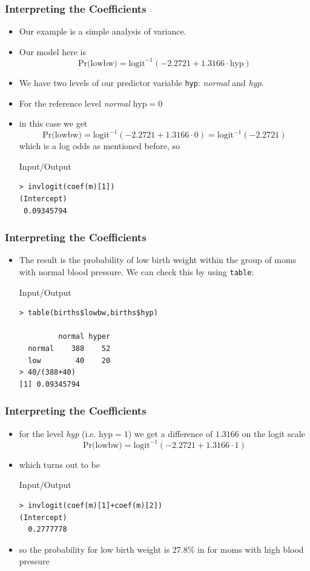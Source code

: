 \begin{frame}[fragile]\frametitle{Interpreting the Coefficients}
\begin{itemize}
\item Our example is a simple analysis of variance. 
\item Our model here is $$\mbox{Pr(lowbw)}=\mbox{logit}^{-1}(-2.2721 + 1.3166 \cdot \mbox{hyp})$$
\item We have two levels of our predictor variable \texttt{hyp}: \emph{normal} and \emph{hyp}. 
\item For the reference level \emph{normal} $\mbox{hyp}=0$ 
\item in this case we get \small $$\mbox{Pr(lowbw)}=\mbox{logit}^{-1}(-2.2721 + 1.3166 \cdot 0) = \mbox{logit}^{-1}(-2.2721)$$ which is a log odds as mentioned before, so 
  \begin{exampleblock}{Input/Output}
\begin{verbatim}
> invlogit(coef(m)[1]) 
(Intercept) 
 0.09345794 
\end{verbatim}
  \end{exampleblock}
\end{itemize}
\end{frame}

\begin{frame}[fragile]\frametitle{Interpreting the Coefficients}
\begin{itemize}
\item The result is the probability of low birth weight within the group of moms with normal blood pressure. We can check this by using \texttt{table}:
  \begin{exampleblock}{Input/Output}
\begin{verbatim}
> table(births$lowbw,births$hyp)
        
         normal hyper
  normal    388    52
  low        40    20
> 40/(388+40)
[1] 0.09345794
\end{verbatim}
  \end{exampleblock}
\end{itemize}
\end{frame}

\begin{frame}[fragile]\frametitle{Interpreting the Coefficients}
\begin{itemize}
\item for the level \emph{hyp} (i.e. $\mbox{hyp}=1$) we get a difference of $1.3166$ on the logit scale $$\mbox{Pr(lowbw)}=\mbox{logit}^{-1}(-2.2721 + 1.3166 \cdot 1) $$
\item which turns out to be
  \begin{exampleblock}{Input/Output}
\begin{verbatim}
> invlogit(coef(m)[1]+coef(m)[2])
(Intercept) 
  0.2777778 
\end{verbatim}
  \end{exampleblock}
\item so the probability for low birth weight is 27.8\% in for moms with high blood pressure
\end{itemize}
\end{frame}

